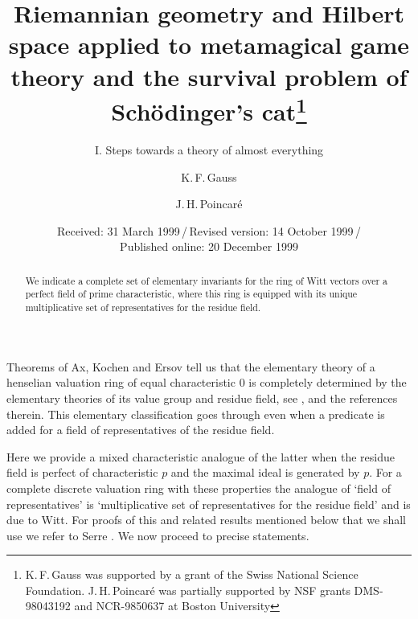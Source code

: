 \documentclass[amalog]{svjour}
\begin{document}
\title{Riemannian geometry and Hilbert space applied to metamagical
game theory and the survival problem of Sch\"odinger's
cat\thanks{K.\,F.\,Gauss was supported by a grant of the Swiss
National Science Foundation. J.\,H.\,Poincar\'e was partially supported
by NSF grants DMS-98043192 and NCR-9850637 at Boston University}}

\subtitle{I. Steps towards a theory of almost everything}

\author{K.\,F.\,Gauss \and J.\,H.\,Poincar\'e }



\date{Received: 31 March 1999\,/\,Revised version: 14 October 1999\,/\\
Published online: 20 December 1999}
\maketitle
\begin{abstract}We indicate a complete set of elementary invariants for
the ring of Witt vectors over a perfect field of prime characteristic, where this
ring is equipped with its unique multiplicative set of representatives for
the residue field.
\end{abstract}

\noindent
Theorems of Ax, Kochen and Ersov tell us that the elementary theory of a
henselian valuation ring of equal
characteristic $0$ is completely determined
by the elementary theories of its value group and residue field, see
\cite{ref1,ref3,ref4}, and the references therein. This elementary
classification goes through even when
a predicate is added for a field of representatives of the residue field.

Here we provide a mixed characteristic analogue of the latter when
the residue field is perfect of characteristic $p$ and the
maximal ideal is generated by $p$. For a complete discrete valuation ring
with these properties the analogue of `field of representatives' is
`multiplicative set of representatives for the residue field' and is due to
Witt. For proofs of this and related results mentioned below that we shall
use we refer to Serre \cite[Ch. II]{ref5}.
We now proceed to precise statements.
\end{document}
